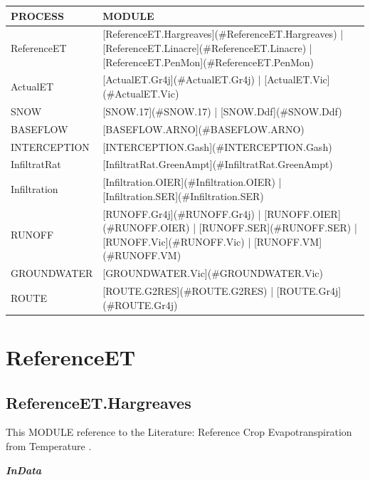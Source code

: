 \documentclass[
]{book}
\begin{document}
\begin{table}[!h]
\centering
\begin{tabular}{l|l}
\hline
PROCESS & MODULE\\
\hline
ReferenceET & [ReferenceET.Hargreaves](\#ReferenceET.Hargreaves) | [ReferenceET.Linacre](\#ReferenceET.Linacre) | [ReferenceET.PenMon](\#ReferenceET.PenMon)\\
\cline{1-2}
ActualET & [ActualET.Gr4j](\#ActualET.Gr4j) | [ActualET.Vic](\#ActualET.Vic)\\
\cline{1-2}
SNOW & [SNOW.17](\#SNOW.17) | [SNOW.Ddf](\#SNOW.Ddf)\\
\cline{1-2}
BASEFLOW & [BASEFLOW.ARNO](\#BASEFLOW.ARNO)\\
\cline{1-2}
INTERCEPTION & [INTERCEPTION.Gash](\#INTERCEPTION.Gash)\\
\cline{1-2}
InfiltratRat & [InfiltratRat.GreenAmpt](\#InfiltratRat.GreenAmpt)\\
\cline{1-2}
Infiltration & [Infiltration.OIER](\#Infiltration.OIER) | [Infiltration.SER](\#Infiltration.SER)\\
\cline{1-2}
RUNOFF & [RUNOFF.Gr4j](\#RUNOFF.Gr4j) | [RUNOFF.OIER](\#RUNOFF.OIER) | [RUNOFF.SER](\#RUNOFF.SER) | [RUNOFF.Vic](\#RUNOFF.Vic) | [RUNOFF.VM](\#RUNOFF.VM)\\
\cline{1-2}
GROUNDWATER & [GROUNDWATER.Vic](\#GROUNDWATER.Vic)\\
\cline{1-2}
ROUTE & [ROUTE.G2RES](\#ROUTE.G2RES) | [ROUTE.Gr4j](\#ROUTE.Gr4j)\\
\hline
\end{tabular}
\end{table}

\hypertarget{ReferenceET}{%
\section{ReferenceET}\label{ReferenceET}}

\hypertarget{ReferenceET.Hargreaves}{%
\subsection{ReferenceET.Hargreaves}\label{ReferenceET.Hargreaves}}

This MODULE reference to the Literature: Reference Crop Evapotranspiration from Temperature \citep{GeorgeH.Hargreaves.1985}.

\textbf{\emph{InData}}
\end{document}
